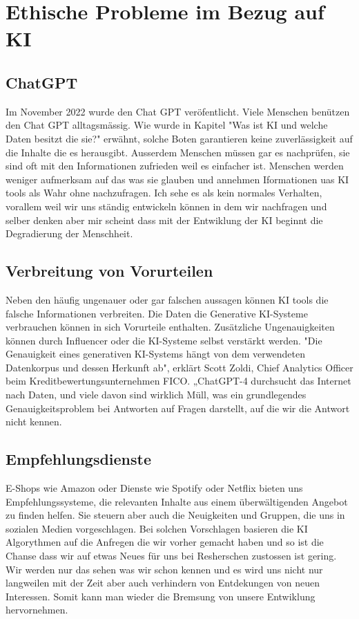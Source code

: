 \documentclass{report}
\begin{document}
 
 \chapter{Ethische Probleme im Bezug auf KI}
 \section{ChatGPT} 
 Im November 2022 wurde den Chat GPT veröfentlicht. Viele Menschen benützen den Chat GPT alltagsmässig. Wie wurde in Kapitel
 "Was ist KI und welche Daten besitzt die sie?" erwähnt, solche Boten garantieren keine zuverlässigkeit auf die Inhalte 
 die es herausgibt. Ausserdem Menschen müssen gar es nachprüfen, sie sind oft mit den Informationen zufrieden weil es einfacher ist.
 Menschen werden weniger aufmerksam auf das was sie glauben und annehmen Iformationen uas KI tools als Wahr ohne nachzufragen.
 Ich sehe es als kein normales Verhalten, vorallem weil wir uns ständig entwickeln können in dem wir nachfragen und selber denken 
    aber mir scheint dass mit der Entwiklung der KI beginnt die Degradierung der Menschheit. 
    
    \section {Verbreitung von Vorurteilen}
    Neben den häufig ungenauer oder gar falschen aussagen können KI tools die falsche Informationen verbreiten. Die Daten die  
    Generative KI-Systeme verbrauchen können in sich Vorurteile enthalten. 
    Zusätzliche Ungenauigkeiten können durch Influencer oder die KI-Systeme selbst verstärkt werden.
    "Die Genauigkeit eines generativen KI-Systems hängt von dem verwendeten Datenkorpus und dessen Herkunft ab",
    erklärt Scott Zoldi, Chief Analytics Officer beim Kreditbewertungsunternehmen FICO. „ChatGPT-4 durchsucht das 
    Internet nach Daten, und viele davon sind wirklich Müll, was ein grundlegendes Genauigkeitsproblem bei Antworten auf Fragen 
    darstellt, auf die wir die Antwort nicht kennen.
    
    \section{Empfehlungsdienste}
    E-Shops wie Amazon oder Dienste wie Spotify oder Netflix bieten uns Empfehlungssysteme, die relevanten Inhalte
    aus einem überwältigenden Angebot zu finden helfen. Sie steuern aber auch die Neuigkeiten und Gruppen,
 die uns in sozialen Medien vorgeschlagen. Bei solchen Vorschlagen basieren die KI Algorythmen auf die Anfregen die wir vorher gemacht haben
 und so ist die Chanse dass wir auf etwas Neues für uns bei Resherschen zustossen ist gering. Wir werden nur das 
 sehen was wir schon kennen und es wird uns nicht nur langweilen mit der Zeit aber auch verhindern von Entdekungen von 
 neuen Interessen. Somit kann man wieder die Bremsung von unsere Entwiklung hervornehmen.
\end{document}
